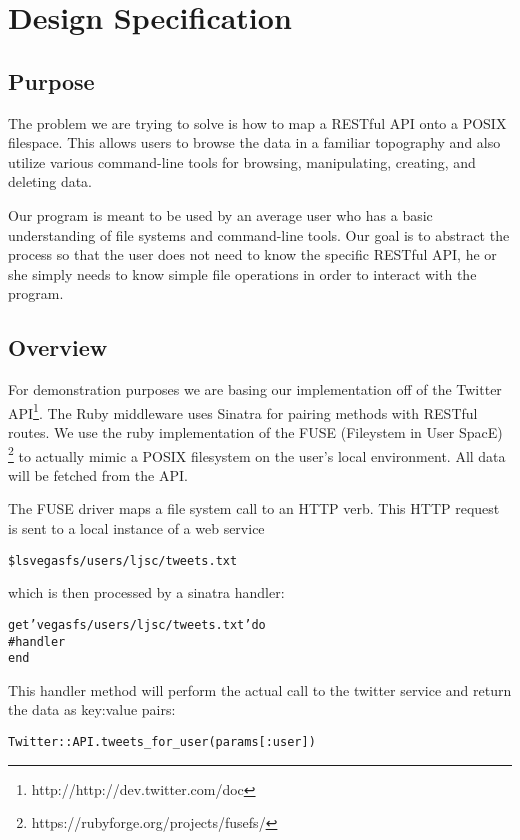 \section{Design Specification}

\subsection{Purpose}

The problem we are trying to solve is how to map a RESTful API onto a POSIX
filespace. This allows users to browse the data in a familiar topography and
also utilize various command-line tools for browsing, manipulating, creating,
and deleting data. 

Our program is meant to be used by an average user who has a basic understanding
of file systems and command-line tools. Our goal is to abstract the process so
that the user does not need to know the specific RESTful API, he or she simply
needs to know simple file operations in order to interact with the program.

\subsection{Overview}

For demonstration purposes we are basing our implementation off of the Twitter
API\footnote{http://http://dev.twitter.com/doc}. The Ruby middleware uses Sinatra
for pairing methods with RESTful routes. We use the ruby implementation of the
FUSE (Fileystem in User SpacE) \footnote{https://rubyforge.org/projects/fusefs/}
to actually mimic a POSIX filesystem on the user's local environment. All data
will be fetched from the API.

The FUSE driver maps a file system call to an HTTP verb. This HTTP request is
sent to a local instance of a web service

\begin{alltt}
	\$ ls vegasfs/users/ljsc/tweets.txt
\end{alltt} 

which is then processed by a sinatra handler:
	
\begin{alltt}
	get 'vegasfs/users/ljsc/tweets.txt' do
	  #handler
	end
\end{alltt}

This handler method will perform the actual call to the twitter service and
return the data as key:value pairs: 

\begin{alltt}
	Twitter::API.tweets\_for\_user(params[:user])
\end{alltt}

